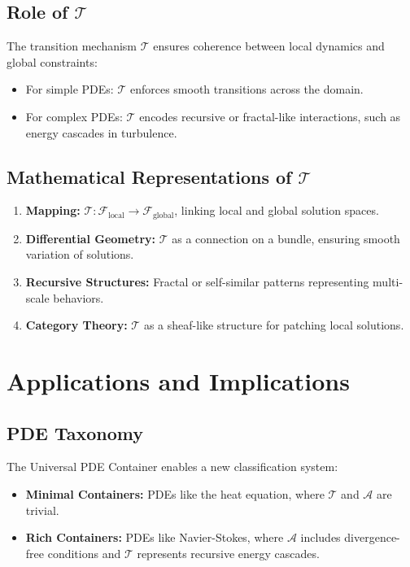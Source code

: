 \documentclass[12pt]{article}
\begin{document}
\subsection{Role of \(\mathcal{T}\)}
The transition mechanism \(\mathcal{T}\) ensures coherence between local dynamics and global constraints:
\begin{itemize}
    \item For simple PDEs: \(\mathcal{T}\) enforces smooth transitions across the domain.
    \item For complex PDEs: \(\mathcal{T}\) encodes recursive or fractal-like interactions, such as energy cascades in turbulence.
\end{itemize}

\subsection{Mathematical Representations of \(\mathcal{T}\)}
\begin{enumerate}
    \item \textbf{Mapping:} \(\mathcal{T}: \mathcal{F}_{\text{local}} \to \mathcal{F}_{\text{global}}\), linking local and global solution spaces.
    \item \textbf{Differential Geometry:} \(\mathcal{T}\) as a connection on a bundle, ensuring smooth variation of solutions.
    \item \textbf{Recursive Structures:} Fractal or self-similar patterns representing multi-scale behaviors.
    \item \textbf{Category Theory:} \(\mathcal{T}\) as a sheaf-like structure for patching local solutions.
\end{enumerate}

\section{Applications and Implications}
\subsection{PDE Taxonomy}
The Universal PDE Container enables a new classification system:
\begin{itemize}
    \item \textbf{Minimal Containers:} PDEs like the heat equation, where \(\mathcal{T}\) and \(\mathcal{A}\) are trivial.
    \item \textbf{Rich Containers:} PDEs like Navier-Stokes, where \(\mathcal{A}\) includes divergence-free conditions and \(\mathcal{T}\) represents recursive energy cascades.
\end{itemize}
\end{document}
